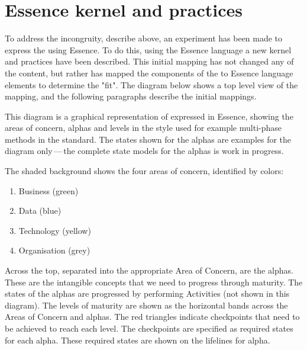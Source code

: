 \section{ Essence kernel and practices}\label{subsec:ekg-mm-essence-kernel-and-practices}

To address the incongruity, describe above, an experiment has been made to express the 
using Essence.
To do this, using the Essence language a new kernel and practices have been described.
This initial mapping has not changed any of the content, but rather has mapped the components of
the  to Essence language elements to determine the "fit".
The diagram below shows a top level view of the mapping, and the following paragraphs describe the initial mappings.


This diagram is a graphical representation of  expressed in Essence,
showing the areas of concern, alphas and levels in the style used for example multi-phase methods
in the  standard.
The states shown for the alphas are examples for the diagram only\,---\,the complete state models for the alphas
is work in progress.

The shaded background shows the four areas of concern, identified by colors:

\begin{enumerate}
    \item Business (green)
    \item Data (blue)
    \item Technology (yellow)
    \item Organisation (grey)
\end{enumerate}

Across the top, separated into the appropriate Area of Concern, are the alphas.
These are the intangible concepts that we need to progress through maturity.
The states of the alphas are progressed by performing Activities (not shown in this diagram).
The levels of maturity are shown as the horizontal bands across the Areas of Concern and alphas.
The red triangles indicate checkpoints that need to be achieved to reach each level.
The checkpoints are specified as required states for each alpha.
These required states are shown on the lifelines for alpha.

